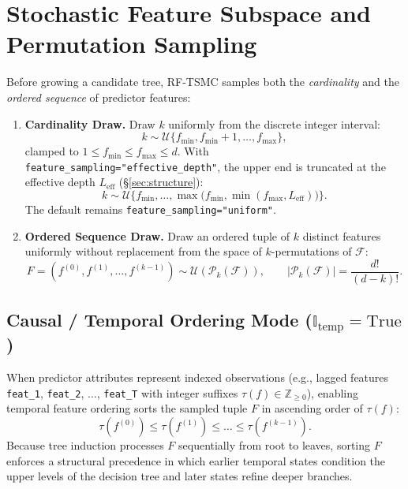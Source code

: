 \documentclass[11pt,a4paper]{article}
\newcommand{\code}[1]{\texttt{#1}}
\newcommand{\Ind}{\mathbb{I}}
\newcommand{\Unif}{\mathcal{U}}
\begin{document}
\section{Stochastic Feature Subspace and Permutation Sampling}
\label{sec:features}

Before growing a candidate tree, RF-TSMC samples both the \emph{cardinality} and the \emph{ordered sequence} of predictor features:
\begin{enumerate}[leftmargin=*, itemsep=4pt]
  \item \textbf{Cardinality Draw.} Draw $k$ uniformly from the discrete integer interval:
  \begin{equation}
    k \sim \Unif\{f_{\min}, f_{\min}+1, \dots, f_{\max}\},
  \end{equation}
  clamped to $1 \le f_{\min} \le f_{\max} \le d$. With \code{feature\_sampling="effective\_depth"}, the upper end is truncated at the effective depth $L_{\text{eff}}$ (\S\ref{sec:structure}):
  \begin{equation}
    k \sim \Unif\big\{f_{\min}, \dots, \max\!\big(f_{\min}, \min(f_{\max}, L_{\text{eff}})\big)\big\}.
  \end{equation}
  The default remains \code{feature\_sampling="uniform"}.

  \item \textbf{Ordered Sequence Draw.} Draw an ordered tuple of $k$ distinct features uniformly without replacement from the space of $k$-permutations of $\mathcal{F}$:
  \begin{equation}
    F = (f^{(0)}, f^{(1)}, \dots, f^{(k-1)}) \sim \Unif\!\left(\mathcal{P}_{k}(\mathcal{F})\right),
    \qquad
    |\mathcal{P}_{k}(\mathcal{F})| = \frac{d!}{(d-k)!}.
  \end{equation}
\end{enumerate}

\subsection*{Causal / Temporal Ordering Mode (\texorpdfstring{$\Ind_{\text{temp}} = \text{True}$}{I\_temp = True})}

When predictor attributes represent indexed observations (e.g., lagged features \code{feat\_1}, \code{feat\_2}, $\dots$, \code{feat\_T} with integer suffixes $\tau(f) \in \mathbb{Z}_{\ge 0}$), enabling temporal feature ordering sorts the sampled tuple $F$ in ascending order of $\tau(f)$:
\begin{equation}
  \tau(f^{(0)}) \le \tau(f^{(1)}) \le \dots \le \tau(f^{(k-1)}).
\end{equation}
Because tree induction processes $F$ sequentially from root to leaves, sorting $F$ enforces a structural precedence in which earlier temporal states condition the upper levels of the decision tree and later states refine deeper branches.
\end{document}
